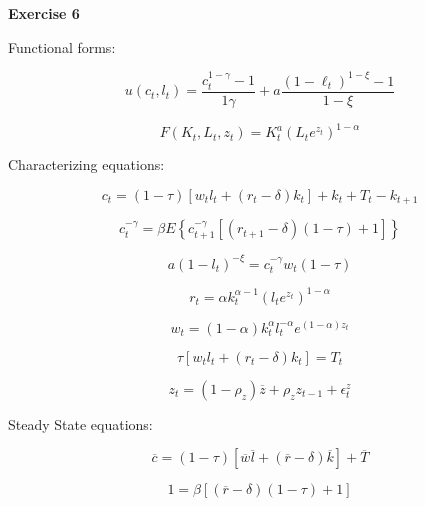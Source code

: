 \documentclass[letterpaper,12pt]{article}
\theoremstyle{definition}
\begin{document}
\vspace{5mm}

\noindent\textbf{Exercise 6}

Functional forms:

$$u\left(c_{t}, l_{t}\right)=\frac{c_{t}^{1-\gamma}-1} {1\gamma}+a \frac{\left(1-\ell_{t}\right)^{1-\xi}-1}{1-\xi}$$

$$F\left(K_{t}, L_{t}, z_{t}\right) =K_{t}^{a}\left(L_{t} e^{z_{t}}\right)^{1-\alpha}$$

Characterizing equations:

\begin{equation}
  c_{t}=(1-\tau)\left[w_{t} l_{t}+\left(r_{t}-\delta\right) k_{t}\right]+k_{t}+T_{t}-k_{t+1}
\end{equation}

\begin{equation}
  c_{t}^{-\gamma}=\beta E\left\{c_{t+1}^{-\gamma}\left[\left(r_{t+1}-\delta\right)(1-\tau)+1\right]\right\}
\end{equation}

\begin{equation}
  a\left(1-l_{t}\right)^{-\xi}=c_{t}^{-\gamma} w_{t}(1-\tau)
\end{equation}

\begin{equation}
  r_{t}=\alpha k_{t}^{\alpha-1}\left(l_t e^{z_{t}}\right)^{1-\alpha}
\end{equation}

\begin{equation}
  w_{t}=(1-\alpha) k_{t}^{\alpha} l_t^{-\alpha}e^{(1-\alpha) z_{t}}
\end{equation}

\begin{equation}
  \tau\left[w_{t} l_{t}+\left(r_{t}-\delta\right) k_{t}\right]=T_{t}
\end{equation}

\begin{equation}
  z_{t}=\left(1-\rho_{z}\right) \overline{z}+\rho_{z} z_{t-1}+\epsilon_{t}^{z}
\end{equation}

Steady State equations:

\begin{equation}
  \overline{c}=(1-\tau)[\overline{w}\overline{l}+(\overline{r}-\delta) \overline{k}]+\overline{T}
\end{equation}

\begin{equation}
  1=\beta[(\overline{r}-\delta)(1-\tau)+1]
\end{equation}
\end{document}
